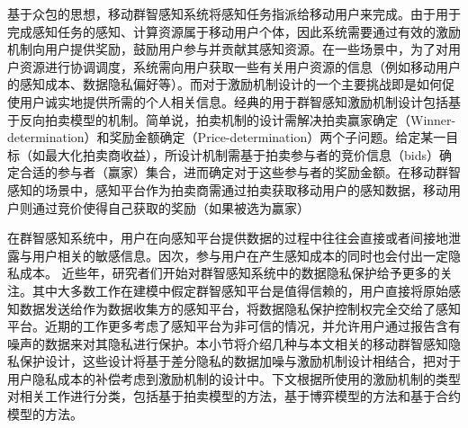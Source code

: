 基于众包的思想，移动群智感知系统将感知任务指派给移动用户来完成。由于用于完成感知任务的感知、计算资源属于移动用户个体，因此系统需要通过有效的激励机制向用户提供奖励，鼓励用户参与并贡献其感知资源。在一些场景中，为了对用户资源进行协调调度，系统需向用户获取一些有关用户资源的信息（例如移动用户的感知成本、数据隐私偏好等）。而对于激励机制设计的一个主要挑战即是如何促使用户诚实地提供所需的个人相关信息。经典的用于群智感知激励机制设计包括基于反向拍卖模型的机制\cite{yang2012crowdsourcing}。简单说，拍卖机制的设计需解决拍卖赢家确定（Winner-determination）和奖励金额确定（Price-determination）两个子问题。给定某一目标（如最大化拍卖商收益），所设计机制需基于拍卖参与者的竞价信息（bids）确定合适的参与者（赢家）集合，进而确定对于这些参与者的奖励金额。在移动群智感知的场景中，感知平台作为拍卖商需通过拍卖获取移动用户的感知数据，移动用户则通过竞价使得自己获取的奖励（如果被选为赢家）

在群智感知系统中，用户在向感知平台提供数据的过程中往往会直接或者间接地泄露与用户相关的敏感信息。因次，参与用户在产生感知成本的同时也会付出一定隐私成本。
近些年，研究者们开始对群智感知系统中的数据隐私保护给予更多的关注\cite{christin2011survey,dandekar2014privacy,ghosh2015selling,jin2016inception,zhang2016privacy,wang2016value,gong2017truthful}。其中大多数工作\cite{christin2011survey,dandekar2014privacy,ghosh2015selling,jin2016inception,zhang2016privacy}在建模中假定群智感知平台是值得信赖的，用户直接将原始感知数据发送给作为数据收集方的感知平台，将数据隐私保护控制权完全交给了感知平台。近期的工作\cite{wang2016value,wang2016buying}更多考虑了感知平台为非可信的情况，并允许用户通过报告含有噪声的数据来对其隐私进行保护。本小节将介绍几种与本文相关的移动群智感知隐私保护设计，这些设计将基于差分隐私的数据加噪与激励机制设计相结合，把对于用户隐私成本的补偿考虑到激励机制的设计中。下文根据所使用的激励机制的类型对相关工作进行分类，包括基于{\kaishu 拍卖模型}的方法，基于{\kaishu 博弈模型}的方法和基于{\kaishu 合约模型}的方法。







